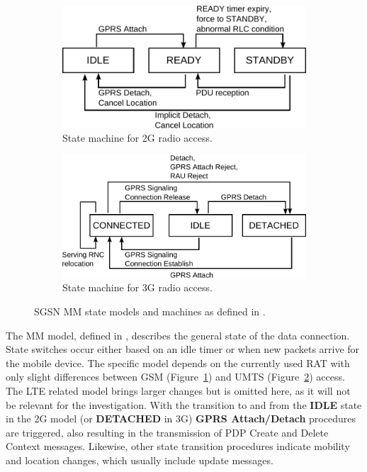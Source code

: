 \begin{figure}[htb]
	\centering
	\begin{subfigure}[b]{0.60\textwidth}
		\includegraphics[width=\textwidth]{images/mm-2g-state-model.pdf}
		\caption{State machine for \acrshort{2G} radio access.}
		\label{c4:fig:2g-mmstatemodel}
	\end{subfigure}%

	\begin{subfigure}[b]{0.70\textwidth}
		\includegraphics[width=\textwidth]{images/mm-3g-state-model.pdf}
		\caption{State machine for \acrshort{3G} radio access.}
		\label{c4:fig:3g-mmstatemodel}
	\end{subfigure}%
	\caption{\acrshort{SGSN} \acrshort{MM} state models and machines as defined in \cite[Section~6.1]{3gpp.23.060}.}
\label{c4:fig:mmstatemodel}
\end{figure}

The \gls{MM} model, defined in \cite[Section~6.1]{3gpp.23.060}, describes the general state of the data connection. State switches occur either based on an idle timer or when new packets arrive for the mobile device. The specific model depends on the currently used \gls{RAT} with only slight differences between \gls{GSM} (Figure~\ref{c4:fig:2g-mmstatemodel}) and \gls{UMTS} (Figure~\ref{c4:fig:3g-mmstatemodel}) access. The \gls{LTE} related model brings larger changes but is omitted here, as it will not be relevant for the investigation. With the transition to and from the \textbf{IDLE} state in the \gls{2G} model (or \textbf{DETACHED} in \gls{3G}) \textbf{GPRS Attach/Detach} procedures are triggered, also resulting in the transmission of \gls{PDP} Create and Delete Context messages. Likewise, other state transition procedures indicate mobility and location changes, which usually include update messages.

